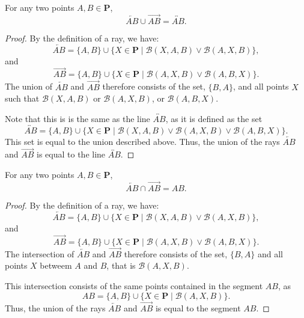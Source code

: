 \documentclass[../../../main/main.tex]{subfiles}
\begin{document}
\begin{theorem}
    For any two points $A, B \in \mathbf{P}$,
    \[
    \overleftarrow{AB} \cup \overrightarrow{AB} = \overleftrightarrow{AB}.
    \]
\end{theorem}
\begin{proof}
    By the definition of a ray, we have:
    \[
    \overleftarrow{AB} = \{A, B\} \cup \{X \in \mathbf{P} \mid \mathcal{B}(X, A, B) \lor \mathcal{B}(A, X, B)\},
    \]
    and
    \[
    \overrightarrow{AB} = \{A, B\} \cup \{X \in \mathbf{P} \mid \mathcal{B}(A, X, B) \lor \mathcal{B}(A, B, X)\}.
    \]
    The union of $\overleftarrow{AB}$ and $\overrightarrow{AB}$ therefore consists of the set, $\{B, A\}$, and all points $X$ such that $\mathcal{B}(X, A, B)$ or $\mathcal{B}(A, X, B)$, or $\mathcal{B}(A, B, X)$.

    Note that this is is the same as the line $\overleftrightarrow{AB}$, as it is defined as the set
    \[
    \overleftrightarrow{AB} = \{A, B\} \cup \{X \in \mathbf{P} \mid \mathcal{B}(X, A, B) \lor \mathcal{B}(A, X, B) \lor \mathcal{B}(A, B, X)\}.
    \]
    This set is equal to the union described above. Thus, the union of the rays $\overleftarrow{AB}$ and $\overrightarrow{AB}$ is equal to the line $\overleftrightarrow{AB}$.
\end{proof}

\begin{theorem}
    For any two points $A, B \in \mathbf{P}$,
    \[
    \overleftarrow{AB} \cap \overrightarrow{AB} = AB.
    \]
\end{theorem}
\begin{proof}
    By the definition of a ray, we have:
    \[
    \overleftarrow{AB} = \{A, B\} \cup \{X \in \mathbf{P} \mid \mathcal{B}(X, A, B) \lor \mathcal{B}(A, X, B)\},
    \]
    and
    \[
    \overrightarrow{AB} = \{A, B\} \cup \{X \in \mathbf{P} \mid \mathcal{B}(A, X, B) \lor \mathcal{B}(A, B, X)\}.
    \]
    The intersection of $\overleftarrow{AB}$ and $\overrightarrow{AB}$ therefore consists of the set, $\{B, A\}$ and all points $X$ betweem $A$ and $B$, that is $\mathcal{B}(A, X, B)$.

    This intersection consists of the same points contained in the segment $AB$, as
    \[
    AB = \{A, B\} \cup \{X \in \mathbf{P} \mid \mathcal{B}(A, X, B)\}.
    \]
    Thus, the union of the rays $\overleftarrow{AB}$ and $\overrightarrow{AB}$ is equal to the segment $AB$.
\end{proof}
\end{document}
